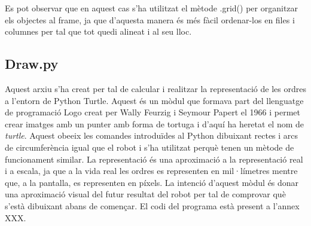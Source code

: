 Es pot observar que en aquest cas s’ha utilitzat el mètode .grid() per organitzar els objectes al frame, ja que d’aquesta manera és més fàcil ordenar-los en files i columnes per tal que tot quedi alineat i al seu lloc.

\subsection{Draw.py} \label{sec:Draw}

Aquest arxiu s’ha creat per tal de calcular i realitzar la representació de les ordres a l’entorn de Python Turtle. Aquest és un mòdul que formava part del llenguatge de programació Logo creat per Wally Feurzig i Seymour Papert el 1966 i permet crear imatges amb un punter amb forma de tortuga i d’aquí ha heretat el nom de \emph{turtle}. Aquest obeeix les comandes introduïdes al Python dibuixant rectes i arcs de circumferència igual que el robot i s’ha utilitzat perquè tenen un mètode de funcionament similar. La representació és una aproximació a la representació real i a escala, ja que a la vida real les ordres es representen en mil·límetres mentre que, a la pantalla, es representen en píxels. La intenció d’aquest mòdul és donar una aproximació visual del futur resultat del robot per tal de comprovar què s’està dibuixant abans de començar. El codi del programa està present a l'annex XXX. 

